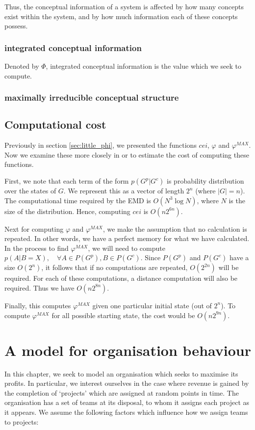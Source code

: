 Thus, the conceptual information of a system is affected by how many concepts exist within the system, and by how much information each of these concepts possess.
\subsubsection{integrated conceptual information}
Denoted by $\Phi$, integrated conceptual information is the value which we seek to compute.


\subsubsection{maximally irreducible conceptual structure}


\subsection{Computational cost}
Previously in section \ref{sec:little_phi}, we presented the functions $cei$, $\varphi$ and $\varphi^{MAX}$. Now we examine these more closely in or to estimate the cost of computing these functions. 

First, we note that each term of the form $p(G^p|G^c)$ is probability distribution over the states of $G$. We represent this as a vector of length $2^n$ (where $|G| = n$). The computational time required by the EMD is $O(N^3 \log N)$, where $N$ is the size of the distribution. Hence, computing $cei$ is $O(n2^{6n})$.

Next for computing $\varphi$ and $\varphi^{MAX}$, we make the assumption that no calculation is repeated. In other words, we have a perfect memory for what we have calculated. In the process to find $\varphi^{MAX}$, we will need to compute $p(A|B= X), \quad \forall A\in P(G^p), B\in P(G^c)$. Since $P(G^p)$ and $P(G^c)$ have a size $O(2^n)$, it follows that if no computations are repeated, $O(2^{2n})$ will be required. For each of these computations, a distance computation will also be required. Thus we have $O(n2^{8n})$. 

Finally, this computes $\varphi^{MAX}$ given one particular initial state (out of $2^n$). To compute $\varphi^{MAX}$ for all possible starting state, the cost would be $O(n2^{9n})$.

\section{A model for organisation behaviour}

In this chapter, we seek to model an organisation which seeks to maximise its profits. In particular, we interest ourselves in the case where revenue is gained by the completion of `projects' which are assigned at random points in time. The organisation has a set of teams at its disposal, to whom it assigns each project as it appears. We assume the following factors which influence how we assign teams to projects:

